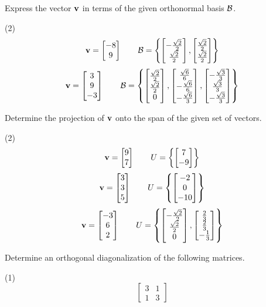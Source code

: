 Express the vector $\mathbf v$ in terms of the given orthonormal basis
$\mathcal B$.
\begin{tasks}[resume, style=enumerate](2)
\task
  \begin{displaymath}
    \mathbf v =  \begin{bmatrix} -8 \\ 9 \end{bmatrix} 
    \qquad
    \mathcal B =
    \left\{
     \begin{bmatrix} -\frac{\sqrt{2}}{2} \\ \frac{\sqrt{2}}{2} \end{bmatrix} ,
     \begin{bmatrix} \frac{\sqrt{2}}{2} \\ \frac{\sqrt{2}}{2} \end{bmatrix} 
    \right\}
  \end{displaymath}
\task
  \begin{displaymath}
    \mathbf v =  \begin{bmatrix} 3 \\ 9 \\ -3 \end{bmatrix} 
    \qquad
    \mathcal B =
    \left\{
     \begin{bmatrix} \frac{\sqrt{2}}{2} \\ \frac{\sqrt{2}}{2} \\ 0 \end{bmatrix} ,
     \begin{bmatrix} \frac{\sqrt{6}}{6} \\ -\frac{\sqrt{6}}{6} \\ -\frac{\sqrt{6}}{3} \end{bmatrix} ,
     \begin{bmatrix} -\frac{\sqrt{3}}{3} \\ \frac{\sqrt{3}}{3} \\ -\frac{\sqrt{3}}{3} \end{bmatrix} 
    \right\}
  \end{displaymath}
\end{tasks}
Determine the projection of $\mathbf v$ onto the span of the given set of vectors.
\begin{tasks}[resume, style=enumerate](2)
\task
  \begin{displaymath}
    \mathbf v =  \begin{bmatrix} 9 \\ 7 \end{bmatrix} 
    \qquad
    U =
    \left\{
     \begin{bmatrix} 7 \\ -9 \end{bmatrix} 
    \right\}
  \end{displaymath}
\task
  \begin{displaymath}
    \mathbf v = \left[\begin{matrix}3\\3\\5\end{matrix}\right]
    \qquad
    U =
    \left\{
    \left[\begin{matrix}-2\\0\\-10\end{matrix}\right]
    \right\}
  \end{displaymath}
\task
  \begin{displaymath}
    \mathbf v = \left[\begin{matrix}-3\\6\\2\end{matrix}\right]
    \qquad
    U =
    \left\{
    \left[\begin{matrix}- \frac{\sqrt{2}}{2}\\\frac{\sqrt{2}}{2}\\0\end{matrix}\right],
    \left[\begin{matrix}\frac{2}{3}\\\frac{2}{3}\\- \frac{1}{3}\end{matrix}\right]
    \right\}
  \end{displaymath}
\end{tasks}
Determine an orthogonal diagonalization of the following matrices.
\begin{tasks}[resume, style=enumerate](1)
\task
  \begin{displaymath}
    \begin{bmatrix}
      3 & 1 \\
      1 & 3
    \end{bmatrix}
  \end{displaymath}
\end{tasks}

